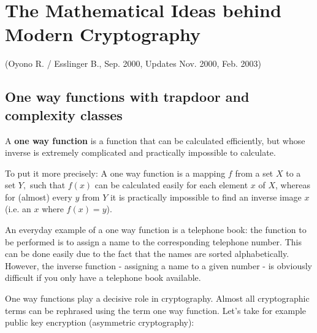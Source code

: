 

\setlength{\fboxrule}{.4pt}
\setlength{\fboxsep}{4pt}

\newpage
\section{The Mathematical Ideas behind Modern Cryptography}
(Oyono R. / Esslinger B., Sep. 2000, Updates Nov. 2000, Feb. 2003)
\subsection{One way functions with trapdoor and complexity classes}
  \hypertarget{OneWayFunktion1}{}
A {\bf one way function} is a function that can be calculated 
efficiently, but whose inverse is extremely complicated and practically 
impossible to calculate.\par

To put it more precisely:  A one way function is a mapping $ f $ from a set $ X 
$ to a set $ Y, $ such that $ f(x) $ can be calculated easily for each element $ 
x $ of $ X $, whereas for (almost) every $ y $ from $ Y $  it is practically 
impossible to find an inverse image $ x $ (i.e. an $ x $ where $ f(x)=y $).\par

An everyday example of a one way function is a telephone book: the function to 
be performed is to assign a name to the corresponding telephone number. This can 
be done easily due to the fact that the names are sorted alphabetically. 
However, the inverse function - assigning a name to a given number - is 
obviously difficult if you only have a telephone book available. \par

One way functions play a decisive role in cryptography. Almost all cryptographic 
terms can be rephrased using the term one way function. Let's take for example 
public key encryption  
(asymmetric cryptography):\par

